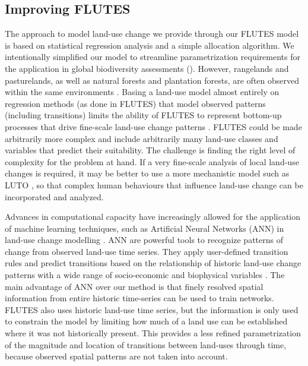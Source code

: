 \subsection{Improving FLUTES}

The approach to model land-use change we provide through our FLUTES model is based on statistical regression analysis and a simple allocation algorithm. We intentionally simplified our model to streamline parametrization requirements for the application in global biodiversity assessments (). However, rangelands and pasturelands, as well as natural forests and plantation forests, are often observed within the same environments \citep[for example, semi-arid rangelands and pasturelands on the Australian continent, or natural forests and plantations in tropical regions, see][]{newbold_reply_2019}. Basing a land-use model almost entirely on regression methods (as done in FLUTES) that model observed patterns (including transitions) limits the ability of FLUTES to represent bottom-up processes that drive fine-scale land-use change patterns \citep{noszczyk_review_2019}. FLUTES could be made arbitrarily more complex and include arbitrarily many land-use classes and variables that predict their suitability. The challenge is finding the right level of complexity for the problem at hand. If a very fine-scale analysis of local land-use changes is required, it may be better to use a more mechanistic model such as LUTO \citep{bryan_supply_2014}, so that complex human behaviours that influence land-use change can be incorporated and analyzed.

Advances in computational capacity have increasingly allowed for the application of machine learning techniques, such as Artificial Neural Networks (ANN) in land-use change modelling \citep{noszczyk_review_2019, koomen_core_2011}. ANN are powerful tools to recognize patterns of change from observed land-use time series. They apply user-defined transition rules and predict transitions based on the relationship of historic land-use change patterns with a wide range of socio-economic and biophysical variables \citep{pijanowski_using_2002}.  The main advantage of ANN over our method is that finely resolved spatial information from entire historic time-series can be used to train networks. FLUTES also uses historic land-use time series, but the information is only used to constrain the model by limiting how much of a land use can be established where it was not historically present. This provides a less refined parametrization of the magnitude and location of transitions between land-uses through time, because observed spatial patterns are not taken into account.

